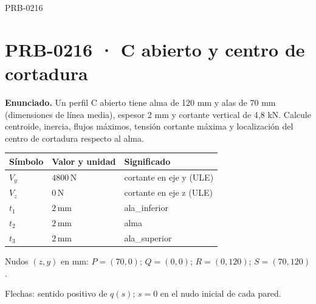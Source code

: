 \begin{studiumworked}{PRB-0216}

\section{PRB-0216 · C abierto y centro de cortadura}

\textbf{Enunciado.} Un perfil C abierto tiene alma de 120 mm y alas de 70 mm (dimensiones de línea media), espesor 2 mm y cortante vertical de 4,8 kN. Calcule centroide, inercia, flujos máximos, tensión cortante máxima y localización del centro de cortadura respecto al alma.

\par\medskip\noindent\begin{tabular}{@{}p{.18\linewidth}p{.26\linewidth}p{.48\linewidth}@{}}
\toprule Símbolo & Valor y unidad & Significado\\\midrule
$V_{y}$ & $4800\,\mathrm{N}$ & cortante en eje y (ULE)\\
$V_{z}$ & $0\,\mathrm{N}$ & cortante en eje z (ULE)\\
$t_{1}$ & $2\,\mathrm{mm}$ & ala\_inferior\\
$t_{2}$ & $2\,\mathrm{mm}$ & alma\\
$t_{3}$ & $2\,\mathrm{mm}$ & ala\_superior\\
\bottomrule\end{tabular}\par\medskip

\par\medskip\noindent\begin{minipage}{\linewidth}\centering
{}
\par\small Nudos $(z,y)$ en mm: $P=(70,0)$; $Q=(0,0)$; $R=(0,120)$; $S=(70,120)$.
\par\small Flechas: sentido positivo de $q(s)$; $s=0$ en el nudo inicial de cada pared.
\par\normalsize\end{minipage}\par\medskip


\end{studiumworked}
